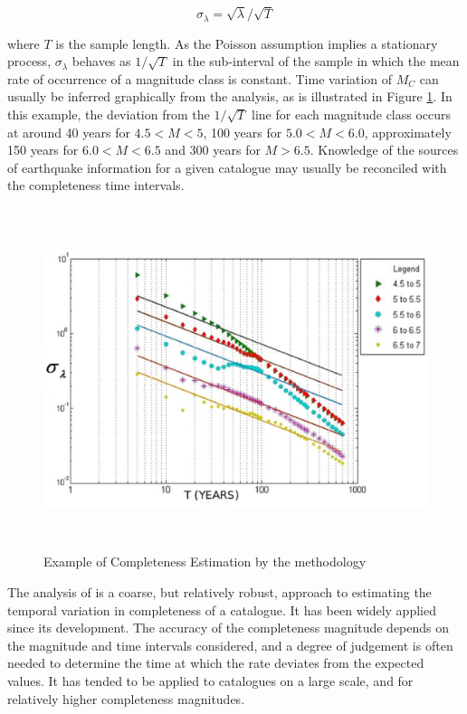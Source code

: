 \begin{equation}
   \sigma_{\lambda} = \sqrt{\lambda} / \sqrt{T}
\end{equation}

where $T$ is the sample length. As the Poisson assumption implies a stationary process, $\sigma_{\lambda}$ behaves as $1/\sqrt{T}$ in the sub-interval of the sample in which the mean rate of occurrence of a magnitude class is constant. Time variation of $M_C$ can usually be inferred graphically from the analysis, as is illustrated in Figure \ref{fig:SteppFigExample1}. In this example, the deviation from the $1/\sqrt{T}$ line for each magnitude class occurs at around 40 years  for $4.5 < M < 5$, 100 years for $5.0  < M < 6.0$, approximately 150 years for $6.0 < M < 6.5$ and 300 years for $M > 6.5$. Knowledge of the sources of earthquake information for a given catalogue may usually be reconciled with the completeness time intervals.

\begin{figure}[htb]
	\centering
		\includegraphics[height=10cm, keepaspectratio=true]{./figures/C2Fig1SteppFig1.eps}
	\caption{Example of Completeness Estimation by the \cite{Stepp1971} methodology}
	\label{fig:SteppFigExample1}
\end{figure}

The analysis of \citet{Stepp1971} is a coarse, but relatively robust, approach to estimating the temporal variation in completeness of a catalogue. It has been widely applied since its development. The accuracy of the completeness magnitude depends on the magnitude and time intervals considered, and a degree of judgement is often needed to determine the time at which the rate deviates from the expected values. It has tended to be applied to catalogues on a large scale, and for relatively higher completeness magnitudes. 

